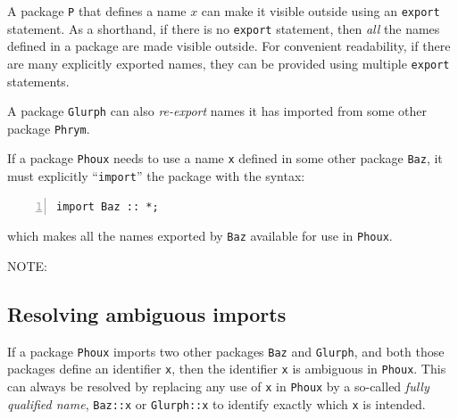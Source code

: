 
A package \verb|P| that defines a name $x$ can make it visible outside
using an \verb|export| statement.  As a shorthand, if there is no
\verb|export| statement, then \emph{all} the names defined in a
package are made visible outside.  For convenient readability, if
there are many explicitly exported names, they can be provided using
multiple \verb|export| statements.

A package \verb|Glurph| can also \emph{re-export} names it has
imported from some other package \verb|Phrym|.

If a package \verb|Phoux| needs to use a name \verb|x| defined in some
other package \verb|Baz|, it must explicitly ``\verb|import|'' the
package with the syntax:

{\small
\begin{Verbatim}[frame=single, numbers=left]
import Baz :: *;
\end{Verbatim}
}

which makes all the names exported by \verb|Baz| available for use in
\verb|Phoux|.

\vspace{2ex}

NOTE:


\subsection{Resolving ambiguous imports}


If a package \verb|Phoux| imports two other packages \verb|Baz| and
\verb|Glurph|, and both those packages define an identifier \verb|x|,
then the identifier \verb|x| is ambiguous in \verb|Phoux|.  This can
always be resolved by replacing any use of \verb|x| in \verb|Phoux| by
a so-called \emph{fully qualified name}, \verb|Baz::x| or
\verb|Glurph::x| to identify exactly which \verb|x| is intended.

